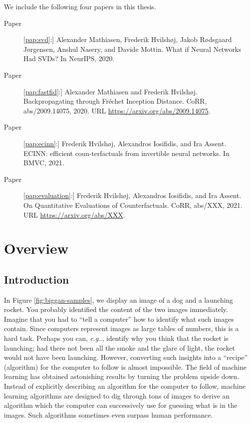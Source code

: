 \documentclass[11pt,a4paper,twoside,openright,final]{memoir}
\makeatletter
\DeclareRobustCommand\onedot{\futurelet\@let@token\@onedot}
\def\@onedot{\ifx\@let@token.\else.\null\fi\xspace}
\def\eg{\emph{e.g}\onedot} \def\Eg{\emph{E.g}\onedot}
\newcommand*{\paperref}[1]{Paper~\hyperref[#1]{\ref{#1}}}
\makeatother
\begin{document}
We include the following four papers in this thesis.
\begin{description}
    \item[\paperref{pap:svd}:] \cite{fasth} Alexander Mathiasen, Frederik Hvilsh\o j, Jakob R\o dsgaard J\o rgensen, Anshul Nasery, and Davide Mottin. What if Neural Networks Had SVDs? In NeurIPS, 2020.
    \item[\paperref{pap:fastfid}:] \cite{fastfid} Alexander Mathiasen and Frederik Hvilshøj.  Backpropagating through Fr\'echet Inception Distance. CoRR, abs/2009.14075, 2020.  URL \url{https://arxiv.org/abs/2009.14075}.
    \item[\paperref{pap:ecinn}:] \cite{ecinn} Frederik Hvilshøj, Alexandros Iosifidis, and Ira Assent. ECINN: efficient coun-terfactuals from invertible neural networks. In BMVC, 2021. 
    \item[\paperref{pap:evaluation}:] \cite{evaluation} Frederik Hvilshøj, Alexandros Iosifidis, and Ira Assent. On Quantitative Evaluations of Counterfactuals. CoRR, abs/{\color{red}XXX, 2021. URL \url{https://arxiv.org/abs/XXX}}.
\end{description}

\cleardoublepage

\tableofcontents
\cleardoublepage

\mainmatter 


\part{Overview}
\label{part:overview}


\chapter{Introduction} 
In Figure \ref{fig:biggan-samples}, we display an image of a dog and a launching rocket. 
You probably identified the content of the two images immediately. 
Imagine that you had to ``tell a computer'' how to identify what such images contain.
Since computers represent images as large tables of numbers, this is a hard task.  
Perhaps you can, \eg, identify why you think that the rocket is launching; had there not been all the smoke and the glare of light, the rocket would not have been launching.
However, converting such insights into a ``recipe'' (algorithm) for the computer to follow is almost impossible.
The field of machine learning has obtained astonishing results by turning the problem upside down.
Instead of explicitly describing an algorithm for the computer to follow, machine learning algorithms are designed to dig through tons of images to derive an algorithm which the computer can successively use for guessing what is in the images. 
Such algorithms sometimes even surpass human performance. 
\end{document}
